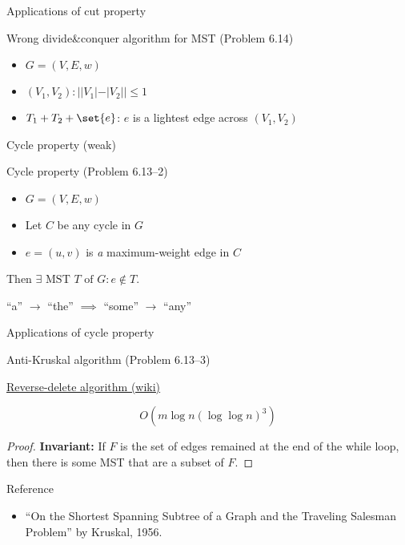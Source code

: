 \begin{frame}{Applications of cut property}
  \begin{exampleblock}{Wrong divide\&conquer algorithm for MST (Problem 6.14)}
    \begin{itemize}
      \item $G = (V, E, w)$
      \item $(V_{1}, V_{2}): ||V_{1}| - |V_{2}|| \le 1$
      \item $T_{1} + T_{2} + \set{e}$: $e$ is a lightest edge across $(V_{1}, V_{2})$
    \end{itemize}
  \end{exampleblock}

\end{frame}
\begin{frame}{Cycle property (weak)}
  \begin{exampleblock}{Cycle property (Problem 6.13--2)}
	\begin{itemize}
	  \item $G = (V,E,w)$
	  \item Let $C$ be any cycle in $G$
	  \item $e = (u,v)$ is \emph{a} maximum-weight edge in $C$
	\end{itemize}
	Then $\exists \textrm{ MST } T \text{ of } G: e \notin T$.
  \end{exampleblock}

  \begin{center}
	``a'' $\to$ ``the'' $\implies$ ``some'' $\to$ ``any''
  \end{center}
\end{frame}
\begin{frame}{Applications of cycle property}
  \begin{exampleblock}{Anti-Kruskal algorithm (Problem 6.13--3)}
	\centerline{\href{https://en.wikipedia.org/wiki/Reverse-delete_algorithm}{Reverse-delete algorithm (wiki)}}

	\[
	  O(m \log n (\log \log n)^3)
	\]
  \end{exampleblock}

  \begin{proof}
	\textbf{Invariant: } If $F$ is the set of edges remained at the end of the while loop, 
	then there is some MST that are a subset of $F$.
  \end{proof}

  \begin{alertblock}{Reference}
	\begin{itemize}
	  \item ``On the Shortest Spanning Subtree of a Graph and the Traveling Salesman Problem'' by Kruskal, 1956.
	\end{itemize}
  \end{alertblock}
\end{frame}
